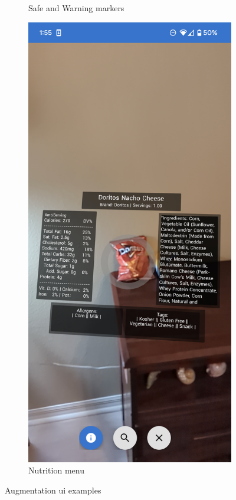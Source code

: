 \documentclass[thesis]{fputhesis}
\begin{document}
\begin{body}
\begin{figure}[h!]
\begin{subfigure}[]{0.3\textwidth}
        \caption{Safe and Warning markers}
        \label{fig:safe-mark}
    \end{subfigure}
    \begin{subfigure}[]{0.3\textwidth}
        \includegraphics[width=\textwidth]{Images/menu-open.png}
        \caption{Nutrition menu}
        \label{fig:open-menu}
    \end{subfigure}
    \caption{Augmentation \acrshort{ui} examples}
    \label{fig:augment-ui}
\end{figure}


\end{body}
\end{document}

